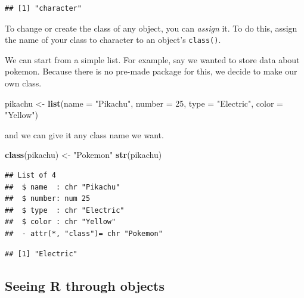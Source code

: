\documentclass[]{book}
\newenvironment{Shaded}{\begin{snugshade}}{\end{snugshade}}
\newcommand{\DataTypeTok}[1]{\textcolor[rgb]{0.13,0.29,0.53}{#1}}
\newcommand{\DecValTok}[1]{\textcolor[rgb]{0.00,0.00,0.81}{#1}}
\newcommand{\KeywordTok}[1]{\textcolor[rgb]{0.13,0.29,0.53}{\textbf{#1}}}
\newcommand{\NormalTok}[1]{#1}
\newcommand{\OperatorTok}[1]{\textcolor[rgb]{0.81,0.36,0.00}{\textbf{#1}}}
\newcommand{\StringTok}[1]{\textcolor[rgb]{0.31,0.60,0.02}{#1}}
\theoremstyle{definition}
\theoremstyle{definition}
\theoremstyle{definition}
\theoremstyle{remark}
\begin{document}
\begin{verbatim}
## [1] "character"
\end{verbatim}

To change or create the class of any object, you can \emph{assign} it. To do this, assign the name of your class to character to an object's \texttt{class()}.

We can start from a simple list. For example, say we wanted to store data about pokemon. Because there is no pre-made package for this, we decide to make our own class.

\begin{Shaded}
\begin{Highlighting}[]
\NormalTok{pikachu <-}\StringTok{ }\KeywordTok{list}\NormalTok{(}\DataTypeTok{name =} \StringTok{"Pikachu"}\NormalTok{,}
                \DataTypeTok{number =} \DecValTok{25}\NormalTok{,}
                \DataTypeTok{type =} \StringTok{"Electric"}\NormalTok{,}
                \DataTypeTok{color =} \StringTok{"Yellow"}\NormalTok{)}
\end{Highlighting}
\end{Shaded}

and we can give it any class name we want.

\begin{Shaded}
\begin{Highlighting}[]
\KeywordTok{class}\NormalTok{(pikachu) <-}\StringTok{ "Pokemon"}
\KeywordTok{str}\NormalTok{(pikachu)}
\end{Highlighting}
\end{Shaded}

\begin{verbatim}
## List of 4
##  $ name  : chr "Pikachu"
##  $ number: num 25
##  $ type  : chr "Electric"
##  $ color : chr "Yellow"
##  - attr(*, "class")= chr "Pokemon"
\end{verbatim}

\begin{Shaded}
\end{Shaded}

\begin{verbatim}
## [1] "Electric"
\end{verbatim}

\hypertarget{seeing-r-through-objects}{%
\subsection{Seeing R through objects}\label{seeing-r-through-objects}}
\end{document}
